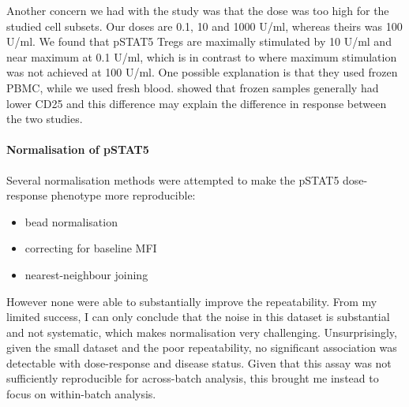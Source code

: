 


Another concern we had with the \citet{Long:2010ej} study was that the dose was too high for the studied cell subsets.
Our doses are 0.1, 10 and 1000 U/ml, whereas theirs was 100 U/ml.
We found that pSTAT5 Tregs are maximally stimulated by 10 U/ml and near maximum at 0.1 U/ml,
which is in contrast to \citet{Long:2010ej} where maximum stimulation was not achieved at 100 U/ml.
One possible explanation is that they used frozen \gls{PBMC}, while we used fresh blood.
\cite{Dendrou:2009dv} showed that frozen samples generally had lower CD25 and this difference may explain the difference in response between the two studies.



\paragraph{Normalisation of pSTAT5}

Several normalisation methods were attempted to make the pSTAT5 dose-response phenotype more reproducible:
\begin{itemize}[noitemsep,topsep=0pt,parsep=0pt,partopsep=0pt]
    \item bead normalisation
    \item correcting for baseline MFI
    \item nearest-neighbour joining
\end{itemize}
However none were able to substantially improve the repeatability.
From my limited success, I can only conclude that the noise in this dataset is substantial and not systematic, which makes normalisation very challenging.
Unsurprisingly, given the small dataset and the poor repeatability, no significant association was detectable with dose-response and disease status.
Given that this assay was not sufficiently reproducible for across-batch analysis, this brought me instead to focus on within-batch analysis.



